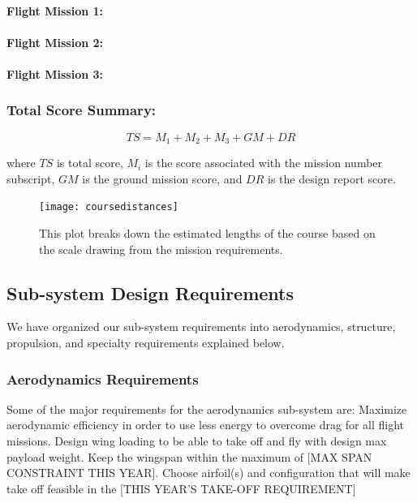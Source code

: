 \documentclass[report]{byu-aero}
\begin{document}
\paragraph{Flight Mission 1:}



\paragraph{Flight Mission 2:}



\paragraph{Flight Mission 3:}



\subsubsection{Total Score Summary:}

\[TS = M_1 + M_2 + M_3 + GM + DR\]

where \(TS\) is total score, \(M_i\) is the score associated with the mission number subscript, \(GM\) is the ground mission score, and \(DR\) is the design report score.

\begin{figure}[h!]
	\centering
	\texttt{[image: coursedistances]}
	\caption{This plot breaks down the estimated lengths of the course based on the scale drawing from the mission requirements.}
	\label{fig:course}
\end{figure}

\subsection{Sub-system Design Requirements}
\label{ssec:MissionReqs}

We have organized our sub-system requirements into aerodynamics, structure, propulsion, and specialty requirements explained below.

\subsubsection{Aerodynamics Requirements}
\label{sssec:AerodynamicReqs}

Some of the major requirements for the aerodynamics sub-system are: Maximize aerodynamic efficiency in order to use less energy to overcome drag for all flight missions.  Design wing loading to be able to take off and fly with design max payload weight.  Keep the wingspan within the maximum of {\color{BYUred}[MAX SPAN CONSTRAINT THIS YEAR]}.  Choose airfoil(s) and configuration that will make take off feasible in the {\color{BYUred}[THIS YEAR'S TAKE-OFF REQUIREMENT]}
\end{document}

